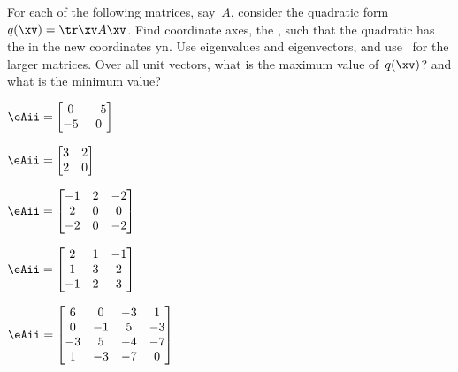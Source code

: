 \begin{exercise} \label{ex:} 
For each of the following matrices, say~\(A\), consider the quadratic form \(q(\xv)=\tr\xv A\xv\).
Find coordinate axes, the , such that the quadratic has the  in the new coordinates \hlist yn.
Use eigenvalues and eigenvectors, and use \script\ for the larger matrices.
Over all unit vectors, what is the maximum value of~\(q(\xv)\)? and what is the minimum value?

\begin{parts}
\item \(\eAii=\begin{bmatrix} 0&-5
\\-5&0 \end{bmatrix}\)

\item \(\eAii=\begin{bmatrix} 3&2
\\2&0 \end{bmatrix}\)

\item \(\eAii=\begin{bmatrix} -1&2&-2
\\2&0&0
\\-2&0&-2 \end{bmatrix}\)

\item \(\eAii=\begin{bmatrix} 2&1&-1
\\1&3&2
\\-1&2&3 \end{bmatrix}\)

\item \(\eAii=\begin{bmatrix} 6&0&-3&1
\\0&-1&5&-3
\\-3&5&-4&-7
\\1&-3&-7&0 \end{bmatrix}\)


\end{parts}
\end{exercise}
